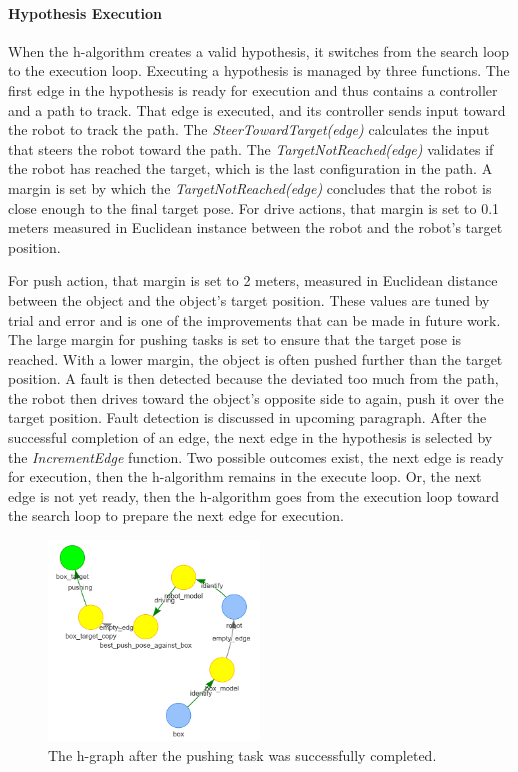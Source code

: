 \paragraph{Hypothesis Execution}
When the \ac{h-algorithm} creates a valid hypothesis, it switches from the search loop to the execution loop. Executing a hypothesis is managed by three functions. The first edge in the hypothesis is ready for execution and thus contains a controller and a path to track. That edge is executed, and its controller sends input toward the robot to track the path. The \textit{SteerTowardTarget(\gls{edge})} calculates the input that steers the robot toward the path. The \textit{TargetNotReached(\gls{edge})} validates if the robot has reached the target, which is the last configuration in the path. A margin is set by which the \textit{TargetNotReached(\gls{edge})} concludes that the robot is close enough to the final target pose. For drive actions, that margin is set to 0.1 meters measured in Euclidean instance between the robot and the robot's target position.

For push action, that margin is set to 2 meters, measured in Euclidean distance between the object and the object's target position. These values are tuned by trial and error and is one of the improvements that can be made in future work. The large margin for pushing tasks is set to ensure that the target pose is reached. With a lower margin, the object is often pushed further than the target position. A fault is then detected because the deviated too much from the path, the robot then drives toward the object's opposite side to again, push it over the target position. Fault detection is discussed in upcoming paragraph. After the successful completion of an edge, the next edge in the hypothesis is selected by the \textit{IncrementEdge} function. Two possible outcomes exist, the next edge is ready for execution, then the \ac{h-algorithm} remains in the execute loop. Or, the next edge is not yet ready, then the \ac{h-algorithm} goes from the execution loop toward the search loop to prepare the next edge for execution.\bs

\begin{figure}[H]
    \centering
    \includegraphics[width=0.5\textwidth]{figures/proposed_method/connecting_nodes/robot_push/robot_push_6}
    \caption{The \ac{h-graph} after the pushing task was successfully completed.}%
    \label{fig:robot_push_5}
\end{figure}

